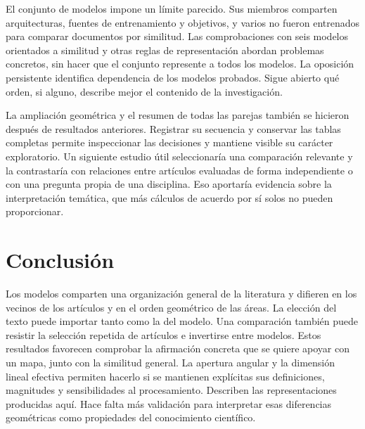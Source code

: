 \documentclass[12pt]{article}
\begin{document}
El conjunto de modelos impone un límite parecido. Sus miembros comparten arquitecturas, fuentes de entrenamiento y objetivos, y varios no fueron entrenados para comparar documentos por similitud. Las comprobaciones con seis modelos orientados a similitud y otras reglas de representación abordan problemas concretos, sin hacer que el conjunto represente a todos los modelos. La oposición persistente identifica dependencia de los modelos probados. Sigue abierto qué orden, si alguno, describe mejor el contenido de la investigación.

La ampliación geométrica y el resumen de todas las parejas también se hicieron después de resultados anteriores. Registrar su secuencia y conservar las tablas completas permite inspeccionar las decisiones y mantiene visible su carácter exploratorio. Un siguiente estudio útil seleccionaría una comparación relevante y la contrastaría con relaciones entre artículos evaluadas de forma independiente o con una pregunta propia de una disciplina. Eso aportaría evidencia sobre la interpretación temática, que más cálculos de acuerdo por sí solos no pueden proporcionar.

\section{Conclusión}
Los modelos comparten una organización general de la literatura y difieren en los vecinos de los artículos y en el orden geométrico de las áreas. La elección del texto puede importar tanto como la del modelo. Una comparación también puede resistir la selección repetida de artículos e invertirse entre modelos. Estos resultados favorecen comprobar la afirmación concreta que se quiere apoyar con un mapa, junto con la similitud general. La apertura angular y la dimensión lineal efectiva permiten hacerlo si se mantienen explícitas sus definiciones, magnitudes y sensibilidades al procesamiento. Describen las representaciones producidas aquí. Hace falta más validación para interpretar esas diferencias geométricas como propiedades del conocimiento científico.
\end{document}
